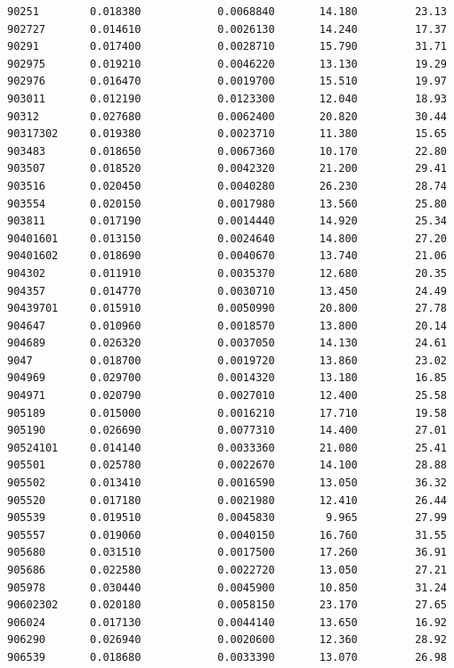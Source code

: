 \documentclass[
  letterpaper,
  DIV=11,
  numbers=noendperiod]{scrartcl}
\begin{document}
\begin{verbatim}
90251        0.018380            0.0068840       14.180         23.13
902727       0.014610            0.0026130       14.240         17.37
90291        0.017400            0.0028710       15.790         31.71
902975       0.019210            0.0046220       13.130         19.29
902976       0.016470            0.0019700       15.510         19.97
903011       0.012190            0.0123300       12.040         18.93
90312        0.027680            0.0062400       20.820         30.44
90317302     0.019380            0.0023710       11.380         15.65
903483       0.018650            0.0067360       10.170         22.80
903507       0.018520            0.0042320       21.200         29.41
903516       0.020450            0.0040280       26.230         28.74
903554       0.020150            0.0017980       13.560         25.80
903811       0.017190            0.0014440       14.920         25.34
90401601     0.013150            0.0024640       14.800         27.20
90401602     0.018690            0.0040670       13.740         21.06
904302       0.011910            0.0035370       12.680         20.35
904357       0.014770            0.0030710       13.450         24.49
90439701     0.015910            0.0050990       20.800         27.78
904647       0.010960            0.0018570       13.800         20.14
904689       0.026320            0.0037050       14.130         24.61
9047         0.018700            0.0019720       13.860         23.02
904969       0.029700            0.0014320       13.180         16.85
904971       0.020790            0.0027010       12.400         25.58
905189       0.015000            0.0016210       17.710         19.58
905190       0.026690            0.0077310       14.400         27.01
90524101     0.014140            0.0033360       21.080         25.41
905501       0.025780            0.0022670       14.100         28.88
905502       0.013410            0.0016590       13.050         36.32
905520       0.017180            0.0021980       12.410         26.44
905539       0.019510            0.0045830        9.965         27.99
905557       0.019060            0.0040150       16.760         31.55
905680       0.031510            0.0017500       17.260         36.91
905686       0.022580            0.0022720       13.050         27.21
905978       0.030440            0.0045900       10.850         31.24
90602302     0.020180            0.0058150       23.170         27.65
906024       0.017130            0.0044140       13.650         16.92
906290       0.026940            0.0020600       12.360         28.92
906539       0.018680            0.0033390       13.070         26.98

\end{verbatim}
\end{document}

